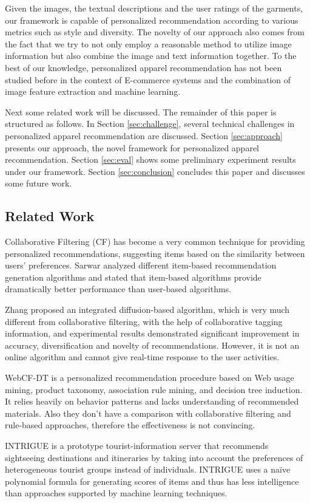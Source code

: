 Given the images, the textual descriptions and the user ratings of the garments,
  our framework is capable of personalized recommendation according to various metrics
  such as style and diversity.
The novelty of our approach also comes from the fact that
  we try to not only employ a reasonable method to utilize 
  image information but also combine the image and text information together.
To the best of our knowledge, personalized apparel recommendation has not been 
  studied before in the context of E-commerce systems and the combination of 
  image feature extraction and machine learning.

Next some related work will be discussed. 
The remainder of this paper is structured as follows. 
In Section \ref{sec:challenge}, several technical challenges in personalized apparel recommendation are discussed.
Section \ref{sec:approach} presents our approach, the novel framework for personalized apparel recommendation.
Section \ref{sec:eval} shows some preliminary experiment results under our framework.
Section \ref{sec:conclusion} concludes this paper and discusses some future work.

\subsection{Related Work}

Collaborative Filtering (CF) \cite{Goldberg92} has become a very common technique 
  for providing personalized recommendations, suggesting items based on the similarity 
  between users' preferences.
Sarwar \etal\cite{Sarwar01} analyzed different item-based recommendation generation algorithms 
  and stated that item-based algorithms provide dramatically better performance than 
  user-based algorithms.

Zhang \etal\cite{Zhang10} proposed an integrated diffusion-based algorithm, which is very much 
  different from collaborative filtering, with the help of collaborative tagging 
  information, and experimental results demonstrated significant improvement in accuracy, 
  diversification and novelty of recommendations. 
However, it is not an online algorithm and cannot give real-time response to the user activities.

WebCF-DT \cite{Kim02} is a personalized recommendation procedure based on Web usage mining, 
  product taxonomy, association rule mining, and decision tree induction. 
It relies heavily on behavior patterns and lacks understanding of recommended materials. 
Also they don't have a comparison with collaborative filtering and rule-based approaches, 
  therefore the effectiveness is not convincing.

INTRIGUE \cite{Ardissono03} is a prototype tourist-information server that recommends 
  sightseeing destinations and itineraries by taking into account the preferences of 
  heterogeneous tourist groups instead of individuals.
INTRIGUE uses a na\"ive polynomial formula for generating scores of items and thus has less 
  intelligence than approaches supported by machine learning techniques.
